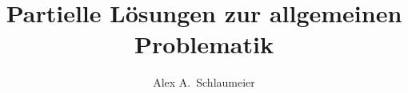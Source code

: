 \documentclass[master,german,smartquotes]{hgbthesis}
\title{Partielle Lösungen zur allgemeinen Problematik}
\author{Alex A.\ Schlaumeier}
\begin{document}

\frontmatter                    %

\maketitle
\tableofcontents

%

		
			

\mainmatter          %










\appendix                                            %


\backmatter       %

\MakeBibliography       %




\end{document}
